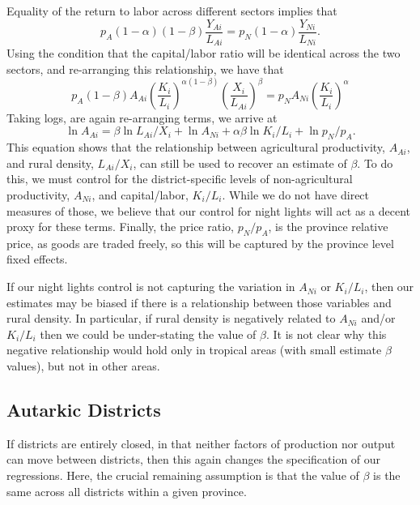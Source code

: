 \documentclass[11pt]{article}
\begin{document}
Equality of the return to labor across different sectors implies that 
\begin{equation}
    p_A (1-\alpha)(1-\beta)\frac{Y_{Ai}}{L_{Ai}} = p_N (1-\alpha)\frac{Y_{Ni}}{L_{Ni}}. \nonumber
\end{equation}
Using the condition that the capital/labor ratio will be identical across the two sectors, and re-arranging this relationship, we have that
\begin{equation}
    p_A (1-\beta) A_{Ai} \left(\frac{K_i}{L_i}\right)^{\alpha(1-\beta)} \left(\frac{X_i}{L_{Ai}}\right)^{\beta} = p_N A_{Ni} \left(\frac{K_i}{L_i}\right)^{\alpha} \nonumber
\end{equation}
Taking logs, are again re-arranging terms, we arrive at
\begin{equation}
    \ln A_{Ai} = \beta \ln L_{Ai}/X_i + \ln A_{Ni} + \alpha\beta \ln K_i/L_i + \ln p_N/p_A. \nonumber
\end{equation}
This equation shows that the relationship between agricultural productivity, $A_{Ai}$, and rural density, $L_{Ai}/X_i$, can still be used to recover an estimate of $\beta$. To do this, we must control for the district-specific levels of non-agricultural productivity, $A_{Ni}$, and capital/labor, $K_i/L_i$. While we do not have direct measures of those, we believe that our control for night lights will act as a decent proxy for these terms. Finally, the price ratio, $p_N/p_A$, is the province relative price, as goods are traded freely, so this will be captured by the province level fixed effects.

If our night lights control is not capturing the variation in $A_{Ni}$ or $K_i/L_i$, then our estimates may be biased if there is a relationship between those variables and rural density. In particular, if rural density is negatively related to $A_{Ni}$ and/or $K_i/L_i$ then we could be under-stating the value of $\beta$. It is not clear why this negative relationship would hold only in tropical areas (with small estimate $\beta$ values), but not in other areas.

\subsection{Autarkic Districts}
If districts are entirely closed, in that neither factors of production nor output can move between districts, then this again changes the specification of our regressions. Here, the crucial remaining assumption is that the value of $\beta$ is the same across all districts within a given province. 
\end{document}
